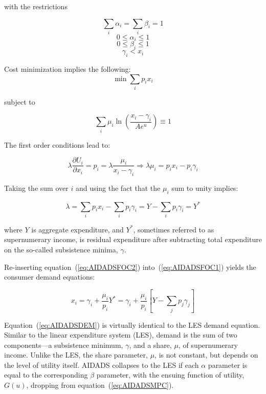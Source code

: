 \noindent with the restrictions

\[\sum\limits_i {{\alpha _i}}  = \sum\limits_i {{\beta _i}}  = 1\]
\[0 \le {\alpha _i} \le 1\]
\[0 \le {\beta _i} \le 1\]
\[{\gamma _i} < {x_i}\]

Cost minimization implies the following:
\[\min \sum\limits_i {{p_i}{x_i}} \]

\noindent subject to

\begin{equation}
\label{eq:AIDADSPRIMAL2}
\sum\limits_i {{\mu _i}\ln \left( {\frac{{{x_i} - {\gamma _i}}}{{A{e^u}}}} \right) \equiv 1}
 \end{equation}

The first order conditions lead to:

\begin{equation}
\label{eq:AIDADSFOC1}
\lambda \frac{{\partial {U_i}}}{{\partial {x_i}}} = {p_i} =
   \lambda \frac{{{\mu _i}}}{{{x_i} - {\gamma _i}}} \Rightarrow \lambda {\mu _i} =
   {p_i}{x_i} - {p_i}{\gamma _i}
\end{equation}

\noindent Taking the sum over $i$ and using the fact that the $\mu_i$ sum to unity implies:

\begin{equation}
\label{eq:AIDADSFOC2}
\lambda  = \sum\limits_i {{p_i}{x_i}}  - \sum\limits_i {{p_i}{\gamma _i}}
   = Y - \sum\limits_i {{p_i}{\gamma _i}}  = {Y^*}
\end{equation}

\noindent where $Y$ is aggregate expenditure, and $Y^*$, sometimes referred to as supernumerary
income, is residual expenditure after subtracting total expenditure on the so-called
subsistence minima, $\gamma$.

Re-inserting equation~(\ref{eq:AIDADSFOC2}) into~(\ref{eq:AIDADSFOC1}) yields the consumer demand
equations:

\begin{equation}
\label{eq:AIDADSDEM}
{x_i} = {\gamma _i} + \frac{{{\mu _i}}}{{{p_i}}}{Y^*} =
   {\gamma _i} + \frac{{{\mu _i}}}{{{p_i}}}\left[ {Y - \sum\limits_j {{p_j}{\gamma _j}} } \right]
\end{equation}

Equation~(\ref{eq:AIDADSDEM}) is virtually identical to the LES demand equation.
Similar to the linear expenditure system (LES), demand is the sum of two components---a
subsistence minimum, $\gamma$, and a share, $\mu$, of supernumerary income. Unlike the LES,
the share parameter, $\mu$, is not constant, but depends on the level of utility itself.
AIDADS collapses to the LES if each $\alpha$ parameter is equal to the corresponding $\beta$
parameter, with the ensuing function of utility, $G(u)$, dropping from
equation~(\ref{eq:AIDADSMPC}).

